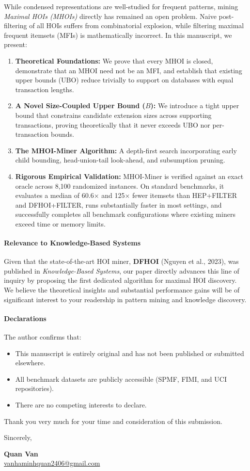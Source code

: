\documentclass[11pt,a4paper]{article}
\begin{document}
While condensed representations are well-studied for frequent patterns, mining \emph{Maximal HOIs (MHOIs)} directly has remained an open problem. Naive post-filtering of all HOIs suffers from combinatorial explosion, while filtering maximal frequent itemsets (MFIs) is mathematically incorrect. In this manuscript, we present:
\begin{enumerate}
    \item \textbf{Theoretical Foundations:} We prove that every MHOI is closed, demonstrate that an MHOI need not be an MFI, and establish that existing upper bounds (UBO) reduce trivially to support on databases with equal transaction lengths.
    \item \textbf{A Novel Size-Coupled Upper Bound ($B$):} We introduce a tight upper bound that constrains candidate extension sizes across supporting transactions, proving theoretically that it never exceeds UBO nor per-transaction bounds.
    \item \textbf{The MHOI-Miner Algorithm:} A depth-first search incorporating early child bounding, head-union-tail look-ahead, and subsumption pruning.
    \item \textbf{Rigorous Empirical Validation:} MHOI-Miner is verified against an exact oracle across 8,100 randomized instances. On standard benchmarks, it evaluates a median of 60.6$\times$ and 125$\times$ fewer itemsets than HEP+FILTER and DFHOI+FILTER, runs substantially faster in most settings, and successfully completes all benchmark configurations where existing miners exceed time or memory limits.
\end{enumerate}

\paragraph{Relevance to Knowledge-Based Systems}
Given that the state-of-the-art HOI miner, \textbf{DFHOI} (Nguyen et al., 2023), was published in \emph{Knowledge-Based Systems}, our paper directly advances this line of inquiry by proposing the first dedicated algorithm for maximal HOI discovery. We believe the theoretical insights and substantial performance gains will be of significant interest to your readership in pattern mining and knowledge discovery.

\paragraph{Declarations}
The author confirms that:
\begin{itemize}
    \item This manuscript is entirely original and has not been published or submitted elsewhere.
    \item All benchmark datasets are publicly accessible (SPMF, FIMI, and UCI repositories).
    \item There are no competing interests to declare.
\end{itemize}

Thank you very much for your time and consideration of this submission.

\vspace{1.5em}

Sincerely,

\vspace{0.8em}
\textbf{Quan Van} \\
\href{mailto:vanhaminhquan2406@gmail.com}{vanhaminhquan2406@gmail.com}
\end{document}
